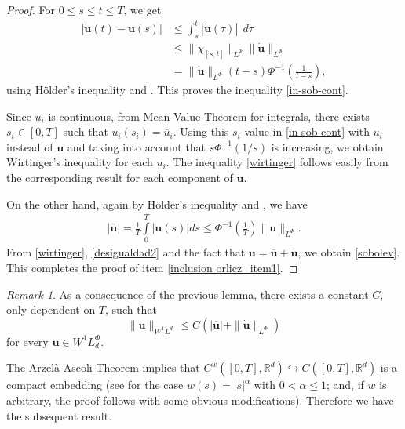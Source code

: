 \documentclass[twoside]{elsarticle}
\theoremstyle{remark}
\newtheorem{comentario}{Remark}
\newcommand{\orlnor}{\|_{L^{\Phi}}}
\newcommand{\lphi}{L^{\Phi}}
\newcommand{\lpsi}{L^{\Psi}}
\newcommand{\wphi}{W^{1}\lphi}
\newcommand{\sobnor}{\|_{W^{1}\lphi}}
\renewcommand{\b}[1]{\boldsymbol{#1}}
\newcommand{\rr}{\mathbb{R}}
\renewcommand{\leq}{\leqslant}
\begin{document}
\begin{proof}
For $0 \leq
s\leq t \leq T $, we get
\begin{equation}\label{equicont}
\begin{split}
\left|\b{u}(t)-\b{u}(s) \right| &\leq \int_{s}^t \left| \b{\dot{u}}(\tau)\right|\ \ d\tau\\
&\leq \| \chi_{[s,t]}\|_{\lpsi}\|\b{\dot{u}}\|_{\lphi}\\
&= \|\b{\dot{u}}\|_{\lphi} ( t-s)\Phi^{-1}\left(\frac{1}{t-s}\right),
\end{split}
\end{equation}
using H\"older's inequality and \cite[Eq. (9.11)]{KR}.
This proves the inequality \eqref{in-sob-cont}.

Since $u_i$ is continuous, from Mean Value Theorem for integrals, 
there exists  $s_i\in [0,T]$ such that $u_i(s_i)=\overline{u}_i$.
Using this $s_i$ value in \eqref{in-sob-cont} with $u_i$ instead of $\b{u}$ and taking into account that $s\Phi^{-1}(1/s)$ is increasing, 
we obtain  Wirtinger's inequality for each $u_i$. The inequality \eqref{wirtinger} 
follows easily from the corresponding result for each component of $\b{u}$.

On the other hand, again by H\"older's inequality and \cite[Eq. (9.11)]{KR}, we have
\begin{equation}\label{desigualdad2}\begin{split}
|\overline{\b{u}}|= \frac{1}{T}\int\limits_{0}^{T}|\b{u}(s)|ds\leq \Phi^{-1}\left(\frac{1}{T}\right)\|\b{u}\orlnor.
\end{split}
\end{equation}
From \eqref{wirtinger}, \eqref{desigualdad2} and the fact that $\b{u}=\overline{\b{u}}+\widetilde{\b{u}}$,  we obtain \eqref{sobolev}. This completes the proof of item \ref{inclusion orlicz_item1}.
\end{proof}

\begin{comentario}
As a consequence of the previous lemma,  
there exists a constant $C$, only dependent on $T$, such that 
\begin{equation}\label{cota_prome}\|\b{u}\sobnor\leq C\left(|\b{\overline{u}}|+\|\b{\dot{u}}\orlnor\right)\end{equation}
for every $\b{u}\in\wphi_d$.
\end{comentario}

The Arzel\`a-Ascoli Theorem implies that  $C^w([0,T],\rr^d)\hookrightarrow C([0,T],\rr^d)$ is a compact  embedding (see \cite[Ch. 5]{driver} for the case $w(s)=|s|^{\alpha}$ with $0< \alpha\leq 1$; and, if  $w$ is arbitrary, the proof follows with some obvious modifications). Therefore we have the subsequent result.
\end{document}
